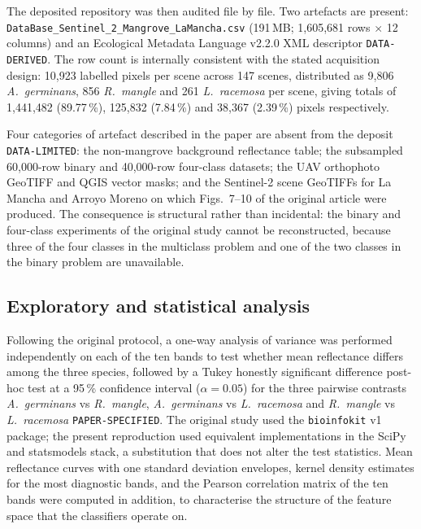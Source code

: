\documentclass[10pt,twocolumn,a4paper]{article}
\newcommand{\evc}[1]{{\footnotesize\texttt{#1}}}
\begin{document}
The deposited repository was then audited file by file. Two artefacts are present:
\texttt{DataBase\_Sentinel\_2\_Mangrove\_LaMancha.csv} (191\,MB; 1{,}605{,}681 rows $\times$ 12
columns) and an Ecological Metadata Language v2.2.0 XML descriptor \evc{DATA-DERIVED}. The row
count is internally consistent with the stated acquisition design: 10{,}923 labelled pixels per
scene across 147 scenes, distributed as 9{,}806 \emph{A.\ germinans}, 856 \emph{R.\ mangle} and 261
\emph{L.\ racemosa} per scene, giving totals of 1{,}441{,}482 (89.77\,\%), 125{,}832 (7.84\,\%) and
38{,}367 (2.39\,\%) pixels respectively.

Four categories of artefact described in the paper are absent from the deposit
\evc{DATA-LIMITED}: the non-mangrove background reflectance table; the subsampled 60{,}000-row
binary and 40{,}000-row four-class datasets; the UAV orthophoto GeoTIFF and QGIS vector masks; and
the Sentinel-2 scene GeoTIFFs for La Mancha and Arroyo Moreno on which Figs.~7--10 of the original
article were produced. The consequence is structural rather than incidental: the binary and
four-class experiments of the original study cannot be reconstructed, because three of the four
classes in the multiclass problem and one of the two classes in the binary problem are unavailable.

\subsection{Exploratory and statistical analysis}
\label{sec:methods-stats}

Following the original protocol, a one-way analysis of variance was performed independently on each
of the ten bands to test whether mean reflectance differs among the three species, followed by a
Tukey honestly significant difference post-hoc test at a 95\,\% confidence interval ($\alpha=0.05$)
for the three pairwise contrasts \emph{A.\ germinans} vs \emph{R.\ mangle}, \emph{A.\ germinans} vs
\emph{L.\ racemosa} and \emph{R.\ mangle} vs \emph{L.\ racemosa} \evc{PAPER-SPECIFIED}. The original
study used the \texttt{bioinfokit} v1 package; the present reproduction used equivalent
implementations in the SciPy and statsmodels stack, a substitution that does not alter the
test statistics. Mean reflectance curves with one standard deviation envelopes, kernel density
estimates for the most diagnostic bands, and the Pearson correlation matrix of the ten bands were
computed in addition, to characterise the structure of the feature space that the classifiers
operate on.
\end{document}
